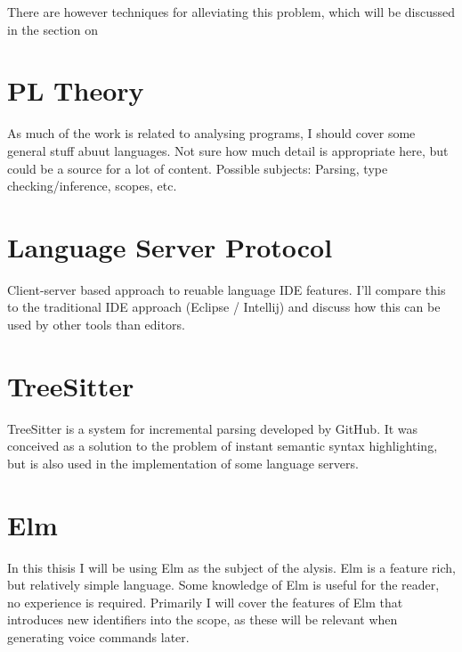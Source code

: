 \documentclass[../thesis.tex]{subfiles}
\begin{document}
There are however techniques for alleviating this problem, which will be discussed in the section on~



\section{PL Theory}
As much of the work is related to analysing programs, I should cover some general stuff abuut languages.
Not sure how much detail is appropriate here, but could be a source for a lot of content.
Possible subjects: Parsing, type checking/inference, scopes, etc.

\section{Language Server Protocol}
Client-server based approach to reuable language IDE features.
I'll compare this to the traditional IDE approach (Eclipse / Intellij)
and discuss how this can be used by other tools than editors.

\section{TreeSitter}
TreeSitter is a system for incremental parsing developed by GitHub.
It was conceived as a solution to the problem of instant semantic syntax highlighting,
but is also used in the implementation of some language servers.

\section{Elm}
In this thisis I will be using Elm as the subject of the alysis.
Elm is a feature rich, but relatively simple language.
Some knowledge of Elm is useful for the reader, no experience is required.
Primarily I will cover the features of Elm that introduces new identifiers into the scope,
as these will be relevant when generating voice commands later.
\end{document}
